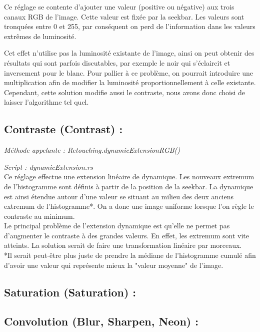 Ce réglage se contente d'ajouter une valeur (positive ou négative) aux trois canaux RGB de l'image. Cette valeur est fixée par la seekbar.
Les valeurs sont tronquées entre 0 et 255, par conséquent on perd de l'information dans les valeurs extrêmes de luminosité.

Cet effet n'utilise pas la luminosité existante de l'image, ainsi on peut obtenir des résultats qui sont parfois discutables, par exemple
le noir qui s'éclaircit et inversement pour le blanc. Pour pallier à ce problème, on pourrait introduire une multiplication afin de modifier
la luminosité proportionnellement à celle existante. Cependant, cette solution modifie aussi le contraste, nous avons donc choisi
de laisser l'algorithme tel quel.


\subsection{Contraste (Contrast) :}

\emph{Méthode appelante : Retouching.dynamicExtensionRGB()}

\emph{Script : dynamicExtension.rs}
\\

Ce réglage effectue une extension linéaire de dynamique. Les nouveaux extremum de l'histogramme sont définis à partir de la position de la seekbar.
La dynamique est ainsi étendue autour d'une valeur se situant au milieu des deux anciens extremum de l'histogramme*. On a donc une image uniforme lorsque
l'on règle le contraste au minimum.
\\
Le principal problème de l'extension dynamique est qu'elle ne permet pas d'augmenter le contraste à des grandes valeurs. En effet, les extremum sont vite
atteints. La solution serait de faire une transformation linéaire par morceaux.
\\

*Il serait peut-être plus juste de prendre la médiane de l'histogramme cumulé afin d'avoir une valeur qui représente mieux la "valeur moyenne" de l'image.


\subsection{Saturation (Saturation) :}





\subsection{Convolution (Blur, Sharpen, Neon) :}

